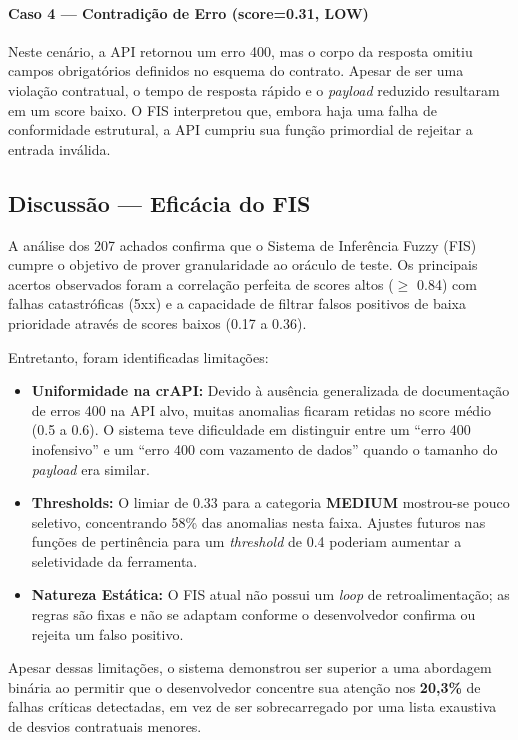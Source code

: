 \paragraph{Caso 4 — Contradição de Erro (score=0.31, LOW)}
Neste cenário, a API retornou um erro 400, mas o corpo da resposta omitiu campos obrigatórios definidos no esquema do contrato. Apesar de ser uma violação contratual, o tempo de resposta rápido e o \textit{payload} reduzido resultaram em um score baixo. O FIS interpretou que, embora haja uma falha de conformidade estrutural, a API cumpriu sua função primordial de rejeitar a entrada inválida.

\subsection{Discussão --- Eficácia do FIS}

A análise dos 207 achados confirma que o Sistema de Inferência Fuzzy (FIS) cumpre o objetivo de prover granularidade ao oráculo de teste. Os principais acertos observados foram a correlação perfeita de scores altos ($\geq$ 0.84) com falhas catastróficas (5xx) e a capacidade de filtrar falsos positivos de baixa prioridade através de scores baixos (0.17 a 0.36).

Entretanto, foram identificadas limitações:

\begin{itemize}
    \item \textbf{Uniformidade na crAPI:} Devido à ausência generalizada de documentação de erros 400 na API alvo, muitas anomalias ficaram retidas no score médio (0.5 a 0.6). O sistema teve dificuldade em distinguir entre um ``erro 400 inofensivo'' e um ``erro 400 com vazamento de dados'' quando o tamanho do \textit{payload} era similar.
    \item \textbf{Thresholds:} O limiar de 0.33 para a categoria \textbf{MEDIUM} mostrou-se pouco seletivo, concentrando 58\% das anomalias nesta faixa. Ajustes futuros nas funções de pertinência para um \textit{threshold} de 0.4 poderiam aumentar a seletividade da ferramenta.
    \item \textbf{Natureza Estática:} O FIS atual não possui um \textit{loop} de retroalimentação; as regras são fixas e não se adaptam conforme o desenvolvedor confirma ou rejeita um falso positivo.
\end{itemize}

Apesar dessas limitações, o sistema demonstrou ser superior a uma abordagem binária ao permitir que o desenvolvedor concentre sua atenção nos \textbf{20,3\%} de falhas críticas detectadas, em vez de ser sobrecarregado por uma lista exaustiva de desvios contratuais menores.

